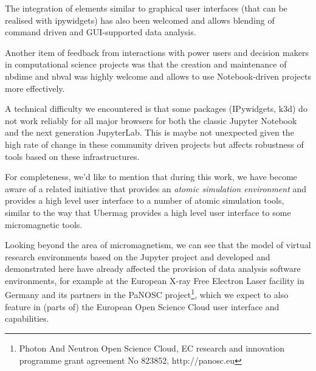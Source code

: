 \documentclass{deliverablereport}
\begin{document}
The integration of elements similar to graphical user interfaces (that
can be realised with ipywidgets) has also been welcomed and allows
blending of command driven and GUI-supported data analysis.

Another item of feedback from interactions with power users and
decision makers in computational science projects was that the
creation and maintenance of nbdime and nbval was highly welcome and
allows to use Notebook-driven projects more effectively.

A technical difficulty we encountered is that some packages
(IPywidgets, k3d) do not work reliably for all major browsers for both
the classic Jupyter Notebook and the next generation JupyterLab. This
is maybe not unexpected given the high rate of change in these
community driven projects but affects robustness of tools based on
these infrastructures.


For completeness, we'd like to mention that during this work, we have
become aware of a related initiative\cite{ase-paper} that provides an
\emph{atomic simulation environment} and provides a high level user
interface to a number of atomic simulation tools, similar to the way
that Ubermag provides a high level user interface to some
micromagnetic tools.

Looking beyond the area of micromagnetism, we can see that the model
of virtual research environments based on the Jupyter project and
developed and demonstrated here have already affected the provision of
data analysis software environments, for example at the European X-ray
Free Electron Laser facility in Germany and its partners in the PaNOSC
project\footnote{Photon And Neutron Open Science Cloud, EC research
  and innovation programme grant agreement No 823852,
  http://panosc.eu}, which we expect to also feature in (parts of) the
European Open Science Cloud user interface and capabilities.

\newpage\printbibliography
\end{document}
